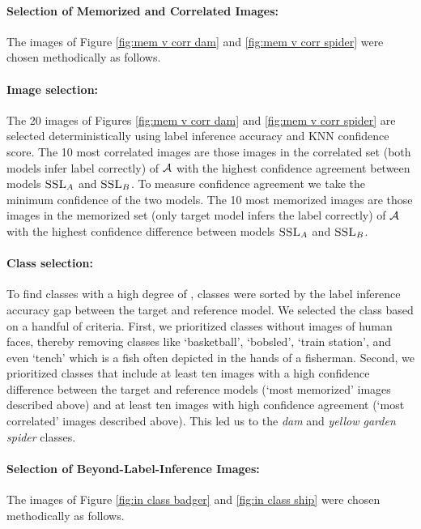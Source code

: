 \paragraph{Selection of Memorized and Correlated Images:} The images of Figure \ref{fig:mem v corr dam} and \ref{fig:mem v corr spider} were chosen methodically as follows. 

\paragraph{Image selection:} The 20 images of Figures \ref{fig:mem v corr dam} and \ref{fig:mem v corr spider} are  selected deterministically using label inference accuracy and KNN confidence score. The 10 most correlated images are those images in the correlated set (both models infer label correctly) of $\mathcal{A}$ with the highest confidence agreement between models $\textsc{SSL}_A$ and $\textsc{SSL}_B$. To measure confidence agreement we take the minimum confidence of the two models. The 10 most memorized images are those images in the memorized set (only target model infers the label correctly) of $\mathcal{A}$ with the highest confidence difference between models $\textsc{SSL}_A$ and $\textsc{SSL}_B$.

\paragraph{Class selection:} To find classes with a high degree of \dejavu, classes were sorted by the label inference accuracy gap between the target and reference model. We selected the class based on a handful of criteria. First, we prioritized classes without images of human faces, thereby removing classes like `basketball', `bobsled', `train station', and even `tench' which is a fish often depicted in the hands of a fisherman. Second, we prioritized classes that include at least ten images with a high confidence difference between the target and reference models (`most memorized' images described above) and at least ten images with high confidence agreement (`most correlated' images described above). This led us to the \emph{dam} and \emph{yellow garden spider} classes. 
\clearpage



\paragraph{Selection of Beyond-Label-Inference Images:} The images of Figure \ref{fig:in class badger} and \ref{fig:in class ship} were chosen methodically as follows. 

